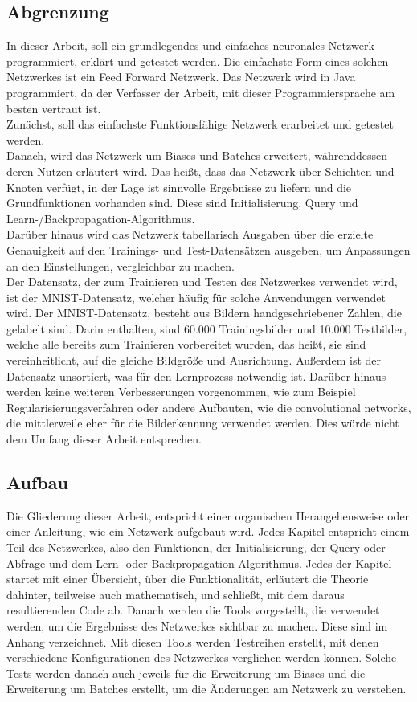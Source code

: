 \documentclass[12pt]{article}
\begin{document}
\subsection{Abgrenzung}
In dieser Arbeit, soll ein grundlegendes und einfaches neuronales Netzwerk programmiert, erklärt und getestet werden. Die einfachste Form eines solchen Netzwerkes ist ein Feed Forward Netzwerk. 
Das Netzwerk wird in Java programmiert, da der Verfasser der Arbeit, mit dieser Programmiersprache am besten vertraut ist.\\
Zunächst, soll das einfachste Funktionsfähige Netzwerk erarbeitet und getestet werden.\\
Danach, wird das Netzwerk um Biases und Batches erweitert, währenddessen deren Nutzen erläutert wird. Das heißt, dass das Netzwerk über Schichten und Knoten verfügt, in der Lage ist sinnvolle Ergebnisse zu liefern und die Grundfunktionen vorhanden sind. Diese sind Initialisierung, Query und Learn-/Backpropagation-Algorithmus. \\
Darüber hinaus wird das Netzwerk tabellarisch Ausgaben über die erzielte Genauigkeit auf den Trainings- und Test-Datensätzen ausgeben, um Anpassungen an den Einstellungen, vergleichbar zu machen.  \\
Der Datensatz, der zum Trainieren und Testen des Netzwerkes verwendet wird, ist der MNIST-Datensatz, welcher häufig für solche Anwendungen verwendet wird. Der MNIST-Datensatz, besteht aus Bildern handgeschriebener Zahlen, die gelabelt sind. Darin enthalten, sind 60.000 Trainingsbilder und 10.000 Testbilder, welche alle bereits zum Trainieren vorbereitet wurden, das heißt, sie sind vereinheitlicht, auf die gleiche Bildgröße und Ausrichtung. Außerdem ist der Datensatz unsortiert, was für den Lernprozess notwendig ist.
Darüber hinaus werden keine weiteren Verbesserungen vorgenommen, wie zum Beispiel Regularisierungsverfahren oder andere Aufbauten, wie die convolutional networks, die mittlerweile eher für die Bilderkennung verwendet werden. Dies würde nicht dem Umfang dieser Arbeit entsprechen.
\subsection{Aufbau}
Die Gliederung dieser Arbeit, entspricht einer organischen Herangehensweise oder einer Anleitung, wie ein Netzwerk aufgebaut wird. Jedes Kapitel entspricht einem Teil des Netzwerkes, also den Funktionen, der Initialisierung, der Query oder Abfrage und dem Lern- oder Backpropagation-Algorithmus. Jedes der Kapitel startet mit einer Übersicht, über die Funktionalität, erläutert die Theorie dahinter, teilweise auch mathematisch, und schließt, mit dem daraus resultierenden Code ab. 
Danach werden die Tools vorgestellt, die verwendet werden, um die Ergebnisse des Netzwerkes sichtbar zu machen. Diese sind im Anhang verzeichnet. 
Mit diesen Tools werden Testreihen erstellt, mit denen verschiedene Konfigurationen des Netzwerkes verglichen werden können. Solche Tests werden danach auch jeweils für die Erweiterung um Biases und die Erweiterung um Batches erstellt, um die Änderungen am Netzwerk zu verstehen.
\end{document}
